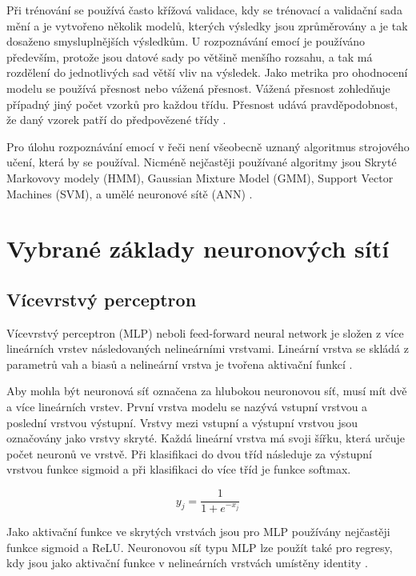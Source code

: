 \documentclass[FM,BP]{tulthesis}
\begin{document}
Při trénování se používá často křížová validace, kdy se trénovací a validační sada mění a je vytvořeno několik modelů, kterých výsledky jsou zprůměrovány a je tak dosaženo smysluplnějších výsledkům. U rozpoznávání emocí je používáno především, protože jsou datové sady po většině menšího rozsahu, a tak má rozdělení do jednotlivých sad větší vliv na výsledek. Jako metrika pro ohodnocení modelu se používá přesnost nebo vážená přesnost. Vážená přesnost zohledňuje případný jiný počet vzorků pro každou třídu. Přesnost udává pravděpodobnost, že daný vzorek patří do předpovězené třídy \cite{konar_chakraborty_2015}.

Pro úlohu rozpoznávání emocí v řeči není všeobecně uznaný algoritmus strojového učení, která by se používal. Nicméně nejčastěji používané algoritmy jsou Skryté Markovovy modely (HMM), Gaussian Mixture Model (GMM), Support Vector Machines (SVM), a umělé neuronové sítě (ANN) \cite{DBLP:journals/speech/AkcayO20}.

\chapter{Vybrané základy neuronových sítí}

\section{Vícevrstvý perceptron} %
Vícevrstvý perceptron (MLP) neboli feed-forward neural network je složen z více lineárních vrstev následovaných nelineárními vrstvami. Lineární vrstva se skládá z parametrů vah a biasů a nelineární vrstva je tvořena aktivační funkcí \cite{DBLP:books/lib/Bishop07}.

Aby mohla být neuronová síť označena za hlubokou neuronovou síť, musí mít dvě a více lineárních vrstev. První vrstva modelu se nazývá vstupní vrstvou a poslední vrstvou výstupní. Vrstvy mezi vstupní a výstupní vrstvou jsou označovány jako vrstvy skryté. Každá lineární vrstva má svoji šířku, která určuje počet neuronů ve vrstvě. Při klasifikaci do dvou tříd následuje za výstupní vrstvou funkce sigmoid a při klasifikaci do více tříd je funkce softmax.

\begin{equation}
\label{eqn:sigmoid}
y_j =  \frac{\mathrm{1} }{\mathrm{1} + e^{-x_j} }
\end{equation}

Jako aktivační funkce ve skrytých vrstvách jsou pro MLP používány nejčastěji funkce sigmoid a ReLU. Neuronovou síť typu MLP lze použít také pro regresy, kdy jsou jako aktivační funkce v nelineárních vrstvách umístěny identity \cite{DBLP:books/lib/Bishop07}.
\end{document}
